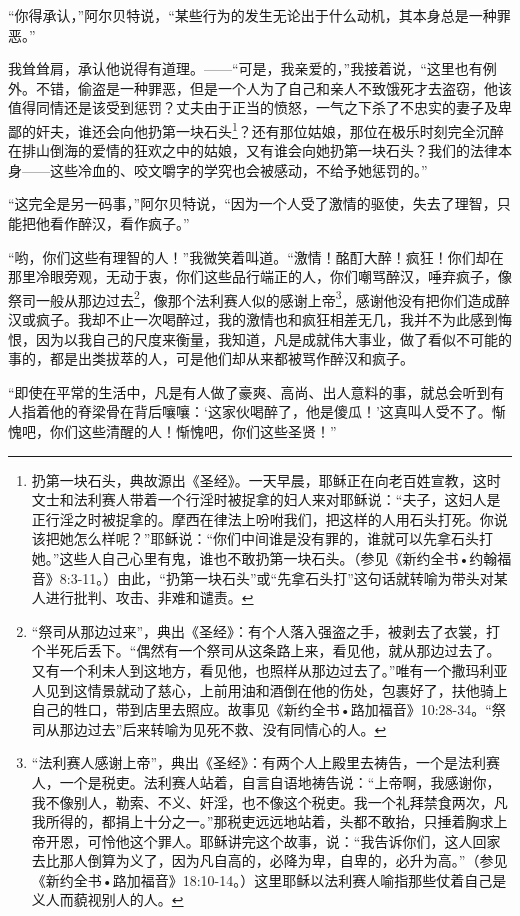 \documentclass[12pt,oneside]{book}
\begin{document}
“你得承认，”阿尔贝特说，“某些行为的发生无论出于什么动机，其本身总是一种罪恶。”

我耸耸肩，承认他说得有道理。——“可是，我亲爱的，”我接着说，“这里也有例外。不错，偷盗是一种罪恶，但是一个人为了自己和亲人不致饿死才去盗窃，他该值得同情还是该受到惩罚？丈夫由于正当的愤怒，一气之下杀了不忠实的妻子及卑鄙的奸夫，谁还会向他扔第一块石头\footnote{扔第一块石头，典故源出《圣经》。一天早晨，耶稣正在向老百姓宣教，这时文士和法利赛人带着一个行淫时被捉拿的妇人来对耶稣说：“夫子，这妇人是正行淫之时被捉拿的。摩西在律法上吩咐我们，把这样的人用石头打死。你说该把她怎么样呢？”耶稣说：“你们中间谁是没有罪的，谁就可以先拿石头打她。”这些人自己心里有鬼，谁也不敢扔第一块石头。（参见《新约全书•约翰福音》8:3-11。）由此，“扔第一块石头”或“先拿石头打”这句话就转喻为带头对某人进行批判、攻击、非难和谴责。}？还有那位姑娘，那位在极乐时刻完全沉醉在排山倒海的爱情的狂欢之中的姑娘，又有谁会向她扔第一块石头？我们的法律本身——这些冷血的、咬文嚼字的学究也会被感动，不给予她惩罚的。”

“这完全是另一码事，”阿尔贝特说，“因为一个人受了激情的驱使，失去了理智，只能把他看作醉汉，看作疯子。”

“哟，你们这些有理智的人！”我微笑着叫道。“激情！酩酊大醉！疯狂！你们却在那里冷眼旁观，无动于衷，你们这些品行端正的人，你们嘲骂醉汉，唾弃疯子，像祭司一般从那边过去\footnote{“祭司从那边过来”，典出《圣经》：有个人落入强盗之手，被剥去了衣裳，打个半死后丢下。“偶然有一个祭司从这条路上来，看见他，就从那边过去了。又有一个利未人到这地方，看见他，也照样从那边过去了。”唯有一个撒玛利亚人见到这情景就动了慈心，上前用油和酒倒在他的伤处，包裹好了，扶他骑上自己的牲口，带到店里去照应。故事见《新约全书•路加福音》10:28-34。“祭司从那边过去”后来转喻为见死不救、没有同情心的人。}，像那个法利赛人似的感谢上帝\footnote{“法利赛人感谢上帝”，典出《圣经》：有两个人上殿里去祷告，一个是法利赛人，一个是税吏。法利赛人站着，自言自语地祷告说：“上帝啊，我感谢你，我不像别人，勒索、不义、奸淫，也不像这个税吏。我一个礼拜禁食两次，凡我所得的，都捐上十分之一。”那税吏远远地站着，头都不敢抬，只捶着胸求上帝开恩，可怜他这个罪人。耶稣讲完这个故事，说：“我告诉你们，这人回家去比那人倒算为义了，因为凡自高的，必降为卑，自卑的，必升为高。”（参见 《新约全书•路加福音》18:10-14。）这里耶稣以法利赛人喻指那些仗着自己是义人而藐视别人的人。}，感谢他没有把你们造成醉汉或疯子。我却不止一次喝醉过，我的激情也和疯狂相差无几，我并不为此感到悔恨，因为以我自己的尺度来衡量，我知道，凡是成就伟大事业，做了看似不可能的事的，都是出类拔萃的人，可是他们却从来都被骂作醉汉和疯子。

“即使在平常的生活中，凡是有人做了豪爽、高尚、出人意料的事，就总会听到有人指着他的脊梁骨在背后嚷嚷：‘这家伙喝醉了，他是傻瓜！’这真叫人受不了。惭愧吧，你们这些清醒的人！惭愧吧，你们这些圣贤！”
\end{document}
